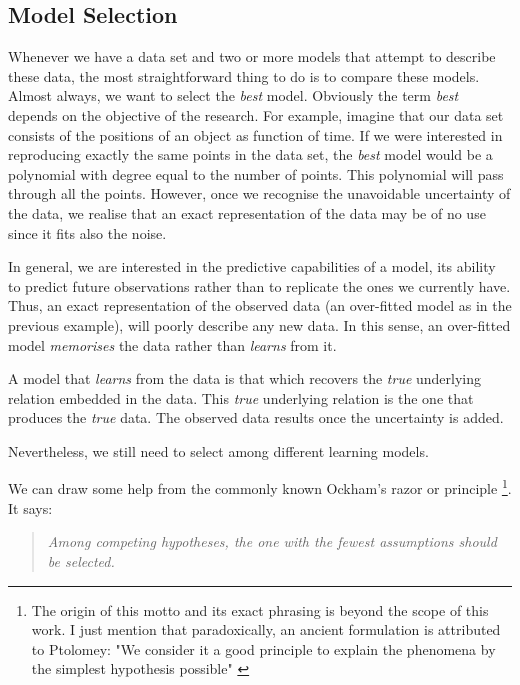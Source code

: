 \subsection{Model Selection}
\label{sect:modelselection}

Whenever we have a data set and two or more models that attempt to describe these data, the most straightforward thing to do is to compare these models. Almost always, we want to select the \emph{best} model. Obviously the term \emph{best} depends on the objective of the research. For example, imagine that our data set consists of the positions of an object as function of time. If we were interested in reproducing exactly the same points in the data set, the \emph{best} model would be a polynomial with degree equal to the number of points. This polynomial will pass through all the points. However, once we recognise the unavoidable uncertainty of the data, we realise that an exact representation of the data may be of no use since it fits also the noise. 

In general, we are interested in the predictive capabilities of a model, its ability to predict future observations rather than to replicate the ones we currently have. Thus, an exact representation of the observed data (an over-fitted model as in the previous example), will poorly describe any new data. In this sense, an over-fitted model \emph{memorises} the data rather than \emph{learns} from it.

A model that \emph{learns} from the data is that which recovers the \emph{true} underlying relation embedded in the data. This \emph{true} underlying relation is the one that produces the \emph{true} data. The observed data results once the uncertainty is added. 

Nevertheless, we still need to select among different learning models.  

We can draw some help from the commonly known Ockham's razor or principle \footnote{The origin of this motto and its exact phrasing is beyond the scope of this work. I just mention that paradoxically, an ancient formulation is attributed to Ptolomey: "We consider it a good principle to explain the phenomena by the simplest hypothesis possible" \citep{Franklin2002}}. It says:
\begin{quotation}
\textit{Among competing hypotheses, the one with the fewest assumptions should be selected.}
\end{quotation}

